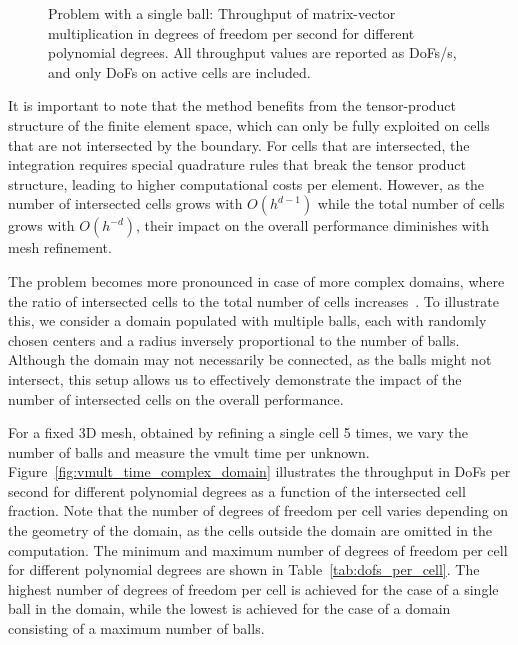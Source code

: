 \documentclass[11pt,a4paper]{article}
\begin{document}
\begin{figure}[!ht]
{
    }
    \caption{Problem with a single ball: Throughput of matrix-vector multiplication in degrees of freedom per second
        for different
        polynomial degrees. All throughput values are reported as DoFs/s, and only DoFs on active cells are
        included.}
    \label{fig:vmult_time_vs_degree}
\end{figure}

It is important to note that the method benefits from the tensor-product structure of the finite element space, which
can only be fully exploited on cells that are not intersected by the boundary. For cells that are intersected, the
integration requires special quadrature rules that break the tensor product structure, leading to higher computational
costs per element. However, as the number of intersected cells grows with $O(h^{d-1})$ while the total number of cells
grows with $O(h^{-d})$, their impact on the overall performance diminishes with mesh refinement.

The problem becomes more pronounced in case of more complex domains, where the ratio of intersected cells to the total
number of cells increases~\cite{bergbauer2024high}. To illustrate this, we consider a domain populated with multiple
balls, each with randomly chosen centers and a radius inversely proportional to the number of balls. Although the
domain may not necessarily be connected, as the balls might not intersect, this setup allows us to effectively
demonstrate the impact of the number of intersected cells on the overall performance.

For a fixed 3D mesh, obtained by refining a single cell 5 times, we vary the number of balls and measure the vmult time
per unknown. Figure~\ref{fig:vmult_time_complex_domain} illustrates the throughput in DoFs per second for different
polynomial degrees as a function of the intersected cell fraction. Note that the number of degrees of freedom per cell
varies depending on the geometry of the domain, as the cells outside the domain are omitted in the computation. The
minimum and maximum number of degrees of freedom per cell for different polynomial degrees are shown in
Table~\ref{tab:dofs_per_cell}. The highest number of degrees of freedom per cell is achieved for the case of a single
ball in the domain, while the lowest is achieved for the case of a domain consisting of a maximum number of balls.
\end{document}

